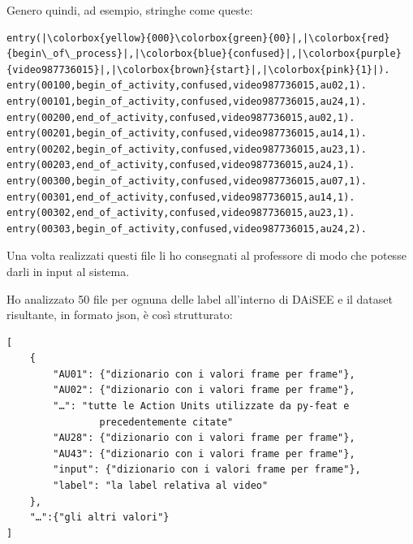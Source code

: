Genero quindi, ad esempio, stringhe come queste:
\begin{verbatim}
entry(|\colorbox{yellow}{000}\colorbox{green}{00}|,|\colorbox{red}{begin\_of\_process}|,|\colorbox{blue}{confused}|,|\colorbox{purple}{video987736015}|,|\colorbox{brown}{start}|,|\colorbox{pink}{1}|).
entry(00100,begin_of_activity,confused,video987736015,au02,1).
entry(00101,begin_of_activity,confused,video987736015,au24,1).
entry(00200,end_of_activity,confused,video987736015,au02,1).
entry(00201,begin_of_activity,confused,video987736015,au14,1).
entry(00202,begin_of_activity,confused,video987736015,au23,1).
entry(00203,end_of_activity,confused,video987736015,au24,1).
entry(00300,begin_of_activity,confused,video987736015,au07,1).
entry(00301,end_of_activity,confused,video987736015,au14,1).
entry(00302,end_of_activity,confused,video987736015,au23,1).
entry(00303,begin_of_activity,confused,video987736015,au24,2).
\end{verbatim}

Una volta realizzati questi file li ho consegnati al professore di modo che potesse darli in input al sistema.

Ho analizzato 50 file per ognuna delle label all’interno di DAiSEE e il dataset risultante, in formato json, è così strutturato:
\newpage
\begin{verbatim}
[
    {
        "AU01": {"dizionario con i valori frame per frame"},
        "AU02": {"dizionario con i valori frame per frame"},
        "…": "tutte le Action Units utilizzate da py-feat e 
                precedentemente citate"
        "AU28": {"dizionario con i valori frame per frame"},
        "AU43": {"dizionario con i valori frame per frame"},
        "input": {"dizionario con i valori frame per frame"},
        "label": "la label relativa al video"
    },
    "…":{"gli altri valori"}
]
\end{verbatim}

